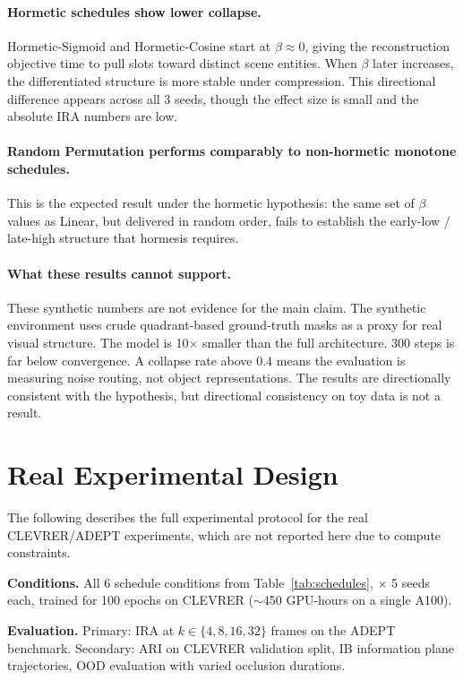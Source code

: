 \documentclass{article}
\begin{document}
\paragraph{Hormetic schedules show lower collapse.}
Hormetic-Sigmoid and Hormetic-Cosine start at $\beta \approx 0$, giving the
reconstruction objective time to pull slots toward distinct scene entities.
When $\beta$ later increases, the differentiated structure is more stable under
compression.
This directional difference appears across all 3 seeds, though the effect size
is small and the absolute IRA numbers are low.

\paragraph{Random Permutation performs comparably to non-hormetic monotone schedules.}
This is the expected result under the hormetic hypothesis: the same set of
$\beta$ values as Linear, but delivered in random order, fails to establish
the early-low / late-high structure that hormesis requires.

\paragraph{What these results cannot support.}
These synthetic numbers are not evidence for the main claim.
The synthetic environment uses crude quadrant-based ground-truth masks as a
proxy for real visual structure.
The model is 10$\times$ smaller than the full architecture.
300 steps is far below convergence.
A collapse rate above $0.4$ means the evaluation is measuring noise routing,
not object representations.
The results are directionally consistent with the hypothesis, but directional
consistency on toy data is not a result.


\section{Real Experimental Design}

The following describes the full experimental protocol for the real CLEVRER/ADEPT
experiments, which are not reported here due to compute constraints.

\textbf{Conditions.} All 6 schedule conditions from Table~\ref{tab:schedules},
$\times$ 5 seeds each, trained for 100 epochs on CLEVRER
($\sim$450 GPU-hours on a single A100).

\textbf{Evaluation.}
Primary: IRA at $k \in \{4, 8, 16, 32\}$ frames on the ADEPT benchmark.
Secondary: ARI on CLEVRER validation split, IB information plane trajectories,
OOD evaluation with varied occlusion durations.
\end{document}
